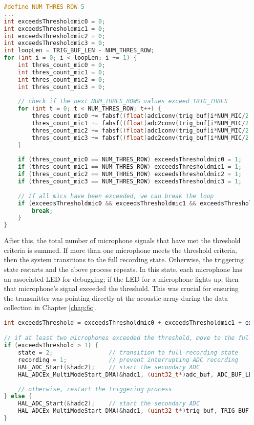 \documentclass[11pt]{ucthesisCP}
\begin{document}
\begin{lstlisting}[language=C++]
#define NUM_THRES_ROW 5
...
int exceedsThresholdmic0 = 0;
int exceedsThresholdmic1 = 0;
int exceedsThresholdmic2 = 0;
int exceedsThresholdmic3 = 0;
int loopLen = TRIG_BUF_LEN - NUM_THRES_ROW;
for (int i = 0; i < loopLen; i += 1) {
	int thres_count_mic0 = 0;
	int thres_count_mic1 = 0;
	int thres_count_mic2 = 0;
	int thres_count_mic3 = 0;
	
	// check if the next NUM_THRES_ROWS values exceed TRIG_THRES
	for (int t = 0; t < NUM_THRES_ROW; t++) {
		thres_count_mic0 += fabsf((float)adc1conv(trig_buf[i*NUM_MIC/2 + t*NUM_MIC/2 + 0]) - mic0_mean) > TRIG_THRES;
		thres_count_mic1 += fabsf((float)adc2conv(trig_buf[i*NUM_MIC/2 + t*NUM_MIC/2 + 0]) - mic1_mean) > TRIG_THRES;
		thres_count_mic2 += fabsf((float)adc1conv(trig_buf[i*NUM_MIC/2 + t*NUM_MIC/2 + 1]) - mic2_mean) > TRIG_THRES;
		thres_count_mic3 += fabsf((float)adc2conv(trig_buf[i*NUM_MIC/2 + t*NUM_MIC/2 + 1]) - mic3_mean) > TRIG_THRES;
	}
	
	if (thres_count_mic0 == NUM_THRES_ROW) exceedsThresholdmic0 = 1;
	if (thres_count_mic1 == NUM_THRES_ROW) exceedsThresholdmic1 = 1;
	if (thres_count_mic2 == NUM_THRES_ROW) exceedsThresholdmic2 = 1;
	if (thres_count_mic3 == NUM_THRES_ROW) exceedsThresholdmic3 = 1;
	
	// If all mics have been exceeded, we can break the loop
	if (exceedsThresholdmic0 && exceedsThresholdmic1 && exceedsThresholdmic2 && exceedsThresholdmic3) {
		break;
	}
}
\end{lstlisting}

After this, the total number of microphone signals that have met the threshold criteria is summed. If more than one microphone meets the threshold criteria, then the system transitions to the full recording state. Otherwise, the triggering state restarts and the above process repeats. In this state, each microphone has an associated LED for debugging; if the LED for a microphone lights up, then that microphone’s signal exceeded the threshold. This was crucial for ensuring the transmitter was pointing directly at the acoustic array during the data collection in Chapter \ref{chap:6c}.

\begin{lstlisting}[language=C++]
int exceedsThreshold = exceedsThresholdmic0 + exceedsThresholdmic1 + exceedsThresholdmic2 + exceedsThresholdmic3;

// if at least two microphones exceeded the threshold, move to the full recording state
if (exceedsThreshold > 1) {
	state = 2;                // transition to full recording state
	recording = 1;            // prevent interrupting ADC recording
	HAL_ADC_Start(&hadc2);    // start the secondary ADC
	HAL_ADCEx_MultiModeStart_DMA(&hadc1, (uint32_t*)adc_buf, ADC_BUF_LEN * NUM_MIC / 2); // start the primary ADC in DMA mode
	
	// otherwise, restart the triggering process
} else {
	HAL_ADC_Start(&hadc2);    // start the secondary ADC
	HAL_ADCEx_MultiModeStart_DMA(&hadc1, (uint32_t*)trig_buf, TRIG_BUF_LEN * NUM_MIC / 2); // start the primary ADC in DMA mode
}
\end{lstlisting}
\end{document}
